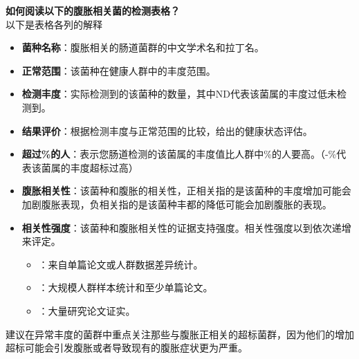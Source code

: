 \documentclass[UTF8]{ctexart}
\begin{document}
\begin{tcolorbox}[
    enhanced,
    colback=lightpurple!10, %
    colframe=lightpurple!10,  %
    arc=3mm,
    boxrule=0.5pt,
    width=\textwidth,
    top=8pt,
    bottom=8pt
]
{\small{\color{lightpurple}\faQuestionCircle}\quad \textbf{如何阅读以下的腹胀相关菌的检测表格？}\\
{\color{orange!50}\faComments}\quad 以下是表格各列的解释
\begin{itemize}
    \item \textbf{菌种名称}：腹胀相关的肠道菌群的中文学术名和拉丁名。
    \item \textbf{正常范围}：该菌种在健康人群中的丰度范围。
    \item \textbf{检测丰度}：实际检测到的该菌种的数量，其中ND代表该菌属的丰度过低未检测到。
    \item \textbf{结果评价}：根据检测丰度与正常范围的比较，给出的健康状态评估。
    \item \textbf{超过\%的人}：表示您肠道检测的该菌属的丰度值比人群中\%的人要高。（-\%代表该菌属的丰度超标过高）
    \item \textbf{腹胀相关性}：该菌种和腹胀的相关性，正相关指的是该菌种的丰度增加可能会加剧腹胀表现，负相关指的是该菌种丰都的降低可能会加剧腹胀的表现。
    \item \textbf{相关性强度}：该菌种和腹胀相关性的证据支持强度。相关性强度以{\small\color{lightgray}\faStar}到{\small\color{lightgray}\faStar \faStar \faStar}依次递增来评定。
    \begin{itemize}
        \item \small{\color{lightgray}\faStar}：来自单篇论文或人群数据差异统计。
        \item \small{\color{lightgray}\faStar\faStar}：大规模人群样本统计和至少单篇论文。
        \item \small{\color{lightgray}\faStar\faStar\faStar}：大量研究论文证实。
    \end{itemize}
\end{itemize}
建议在异常丰度的菌群中重点关注那些与腹胀正相关的超标菌群，因为他们的增加超标可能会引发腹胀或者导致现有的腹胀症状更为严重。
}
\end{tcolorbox}
\end{document}
